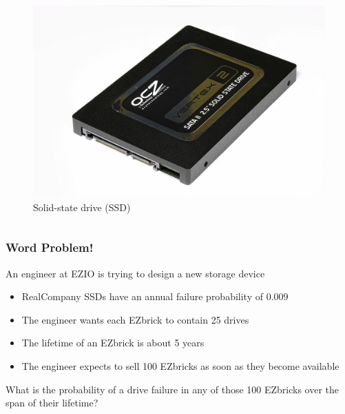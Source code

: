 \documentclass{beamer}
\theoremstyle{mystyle}
\begin{document}
\begin{frame}
\begin{columns}
\begin{figure}
			\includegraphics[scale=0.10]{ssd.jpg}
			\caption{Solid-state drive (SSD)}
		\end{figure}
\end{columns}
\end{frame}


\begin{frame}
\frametitle{Word Problem!}
An engineer at EZIO is trying to design a new storage device
\vspace{0.2in}
	\begin{itemize}
		\item RealCompany SSDs have an annual failure probability of 0.009
		\pause
		\vspace{0.1in}
		\item The engineer wants each EZbrick to contain 25 drives
		\pause
		\vspace{0.1in}
		\item The lifetime of an EZbrick is about 5 years
		\pause
		\vspace{0.1in} 
		\item The engineer expects to sell 100 EZbricks as soon as they become available
	\end{itemize}
\pause
\vspace{0.2in}
What is the probability of a drive failure in any of those 100 EZbricks over the span of their lifetime?

	
\end{frame}
\end{document}
